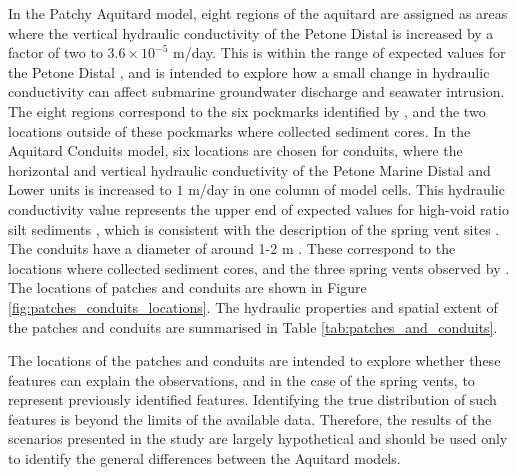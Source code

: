 \documentclass[pdflatex,sn-apa]{sn-jnl}%
\begin{document}
In the Patchy Aquitard model, eight regions of the aquitard are assigned as areas where the vertical hydraulic conductivity of the Petone Distal is increased by a factor of two to $3.6 \times 10^{-5}$ m/day.
This is within the range of expected values for the Petone Distal \citep{bennett_hutt_2024},
and is intended to explore how a small change in hydraulic conductivity can affect submarine groundwater discharge and seawater intrusion.
The eight regions correspond to the six pockmarks identified by \cite{harding_characteristics_2000}, and the two locations outside of these pockmarks where \cite{hoffmann_fresh_2023} collected sediment cores.
In the Aquitard Conduits model, six locations are chosen for conduits,
where the horizontal and vertical hydraulic conductivity of the Petone Marine Distal and Lower units is increased to $1$ m/day in one column of model cells.
This hydraulic conductivity value represents the upper end of expected values for high-void ratio silt sediments \citep{zhu_experimental_2021},
which is consistent with the description of the spring vent sites \citep{hoffmann_fresh_2023, harding_characteristics_2000}.
The conduits have a diameter of around 1-2 m \citep{harding_characteristics_2000}.
These correspond to the locations where \cite{hoffmann_fresh_2023} collected sediment cores,
and the three spring vents observed by \cite{harding_characteristics_2000}.
The locations of patches and conduits are shown in Figure \ref{fig:patches_conduits_locations}.
The hydraulic properties and spatial extent of the patches and conduits are summarised in Table \ref{tab:patches_and_conduits}.

The locations of the patches and conduits are intended to explore whether these features can explain the observations,
and in the case of the spring vents, to represent previously identified features.
Identifying the true distribution of such features is beyond the limits of the available data.
Therefore, the results of the scenarios presented in the study are largely hypothetical and should be used only to identify the general differences between the Aquitard models.
\end{document}
